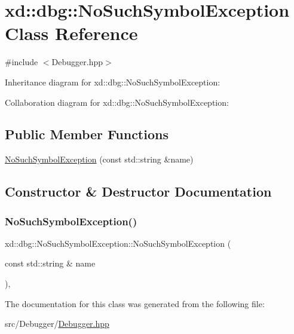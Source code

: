 \hypertarget{classxd_1_1dbg_1_1_no_such_symbol_exception}{}\section{xd\+:\+:dbg\+:\+:No\+Such\+Symbol\+Exception Class Reference}
\label{classxd_1_1dbg_1_1_no_such_symbol_exception}


{\ttfamily \#include $<$Debugger.\+hpp$>$}



Inheritance diagram for xd\+:\+:dbg\+:\+:No\+Such\+Symbol\+Exception\+:


Collaboration diagram for xd\+:\+:dbg\+:\+:No\+Such\+Symbol\+Exception\+:
\subsection*{Public Member Functions}
\begin{DoxyCompactItemize}
\item 
\mbox{\hyperlink{classxd_1_1dbg_1_1_no_such_symbol_exception_a0fc3cc772e49044ff68fdfb9be33ace1}{No\+Such\+Symbol\+Exception}} (const std\+::string \&name)
\end{DoxyCompactItemize}


\subsection{Constructor \& Destructor Documentation}
\mbox{\label{classxd_1_1dbg_1_1_no_such_symbol_exception_a0fc3cc772e49044ff68fdfb9be33ace1}} 
\subsubsection{\texorpdfstring{No\+Such\+Symbol\+Exception()}{NoSuchSymbolException()}}
{\footnotesize\ttfamily xd\+::dbg\+::\+No\+Such\+Symbol\+Exception\+::\+No\+Such\+Symbol\+Exception (\begin{DoxyParamCaption}\item[{const std\+::string \&}]{name }\end{DoxyParamCaption})\hspace{0.3cm}{\ttfamily [inline]}, {\ttfamily [explicit]}}



The documentation for this class was generated from the following file\+:\begin{DoxyCompactItemize}
\item 
src/\+Debugger/\mbox{\hyperlink{_debugger_8hpp}{Debugger.\+hpp}}\end{DoxyCompactItemize}
